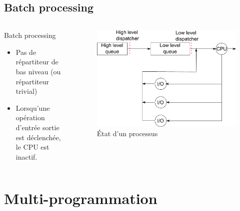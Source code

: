 \begin{frame}{\sectitle}
\def\subsectitle{Batch processing}
\subsection{\subsectitle}

\begin{columns}[c]

\begin{block}{\subsectitle}
\begin{itemize}
    \item Pas de répartiteur de bas niveau (ou répartiteur trivial)
    \item Lorsqu'une opération d'entrée sortie est déclenchée, le CPU est
    inactif.
\end{itemize}
\end{block}

\begin{figure}
\includegraphics[width=\textwidth]{images/batchDispatching.pdf}
\caption{État d'un processus}
\end{figure}

\end{columns}

\end{frame}

\def\sectitle{Multi-programmation}
\section{\sectitle}

